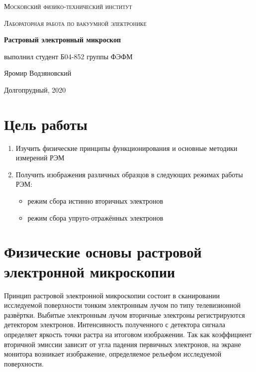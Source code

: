 \documentclass[a4paper]{article}
\begin{document}
\graphicspath{ {pictures/} }

\begin{titlepage}
	\centering
	\vspace{5cm}
    {\scshape\LARGE Московский физико-технический институт\par}
    

	\vspace{8cm}
	{\scshape\Large Лабораторная работа по вакуумной электронике \par}
	\vspace{2cm}
    {\huge\bfseries Растровый электронный микроскоп \par}
	\vspace{4cm}
	\vfill
\begin{flushright}
	{\large выполнил студент Б04-852 группы ФЭФМ}\par
	\vspace{0.3cm}
	{\LARGE Яромир Водзяновский}
\end{flushright}
	
	\vfill
Долгопрудный, 2020
\end{titlepage}

\pagestyle{fancy} 
\fancyhead{}
\fancyhead[C]{}
\fancyfoot[C]{ \noindent\rule{\textwidth}{0.4pt} \thepage }


\newpage

\section{Цель работы}

\begin{enumerate}
    \item Изучить физические принципы функционирования и основные методики измерений РЭМ
    \item Получить изображения различных образцов в следующих режимах работы РЭМ:
    \begin{itemize}
        \item режим сбора истинно вторичных электронов
        \item режим сбора упруго-отражённых электронов
    \end{itemize}
\end{enumerate}

\section{Физические основы растровой электронной микроскопии}
Принцип растровой электронной микроскопии состоит в сканировании исследуемой поверхности тонким электронным 
лучом по типу телевизионной развёртки. Выбитые электронным лучом вторичные электроны регистрируются детектором 
электронов. Интенсивность полученного с детектора сигнала определяет яркость точки растра на итоговом изображении. 
Так как коэффициент вторичной эмиссии зависит от угла падения первичных электронов, на экране монитора возникает 
изображение, определяемое рельефом исследуемой поверхности.
\end{document}
